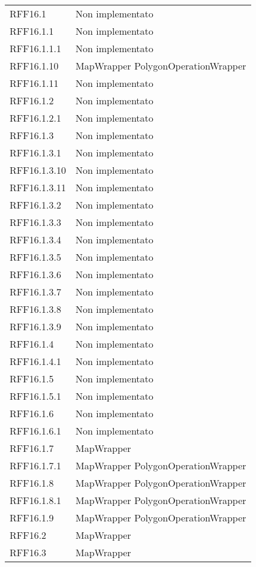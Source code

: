 \begin{longtable}{p{2.5cm}!{\VRule[1pt]}p{5cm}}
	RFF16.1 & Non implementato\\
	RFF16.1.1 & Non implementato\\
	RFF16.1.1.1 & Non implementato\\
	RFF16.1.10 & MapWrapper \newline PolygonOperationWrapper\\
	RFF16.1.11 & Non implementato\\
	RFF16.1.2 & Non implementato\\
	RFF16.1.2.1 & Non implementato\\
	RFF16.1.3 & Non implementato\\
	RFF16.1.3.1 & Non implementato\\
	RFF16.1.3.10 & Non implementato\\
	RFF16.1.3.11 & Non implementato\\
	RFF16.1.3.2 & Non implementato\\
	RFF16.1.3.3 & Non implementato\\
	RFF16.1.3.4 & Non implementato\\
	RFF16.1.3.5 & Non implementato\\
	RFF16.1.3.6 & Non implementato\\
	RFF16.1.3.7 & Non implementato\\
	RFF16.1.3.8 & Non implementato\\
	RFF16.1.3.9 & Non implementato\\
	RFF16.1.4 & Non implementato\\
	RFF16.1.4.1 & Non implementato\\
	RFF16.1.5 & Non implementato\\
	RFF16.1.5.1 & Non implementato\\
	RFF16.1.6 & Non implementato\\
	RFF16.1.6.1 & Non implementato\\
	RFF16.1.7 & MapWrapper\\
	RFF16.1.7.1 & MapWrapper \newline PolygonOperationWrapper\\
	RFF16.1.8 & MapWrapper \newline PolygonOperationWrapper\\
	RFF16.1.8.1 & MapWrapper \newline PolygonOperationWrapper\\
	RFF16.1.9 & MapWrapper \newline PolygonOperationWrapper\\
	RFF16.2 & MapWrapper\\
	RFF16.3 & MapWrapper\\

\end{longtable}
